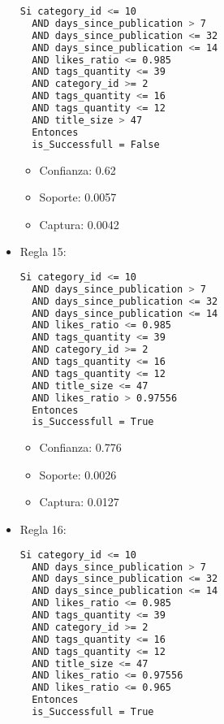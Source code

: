 \begin{itemize}
\begin{lstlisting}[language=bash, numbers=none]
  Si category_id <= 10
  AND days_since_publication > 7
  AND days_since_publication <= 32
  AND days_since_publication <= 14
  AND likes_ratio <= 0.985
  AND tags_quantity <= 39
  AND category_id >= 2
  AND tags_quantity <= 16
  AND tags_quantity <= 12
  AND title_size > 47
  Entonces
  is_Successfull = False
\end{lstlisting}

    \begin{itemize}
      \item Confianza: 0.62
      \item Soporte: 0.0057
      \item Captura: 0.0042
    \end{itemize}

  \item Regla 15:

\begin{lstlisting}[language=bash, numbers=none]
  Si category_id <= 10
  AND days_since_publication > 7
  AND days_since_publication <= 32
  AND days_since_publication <= 14
  AND likes_ratio <= 0.985
  AND tags_quantity <= 39
  AND category_id >= 2
  AND tags_quantity <= 16
  AND tags_quantity <= 12
  AND title_size <= 47
  AND likes_ratio > 0.97556
  Entonces
  is_Successfull = True
\end{lstlisting}

    \begin{itemize}
      \item Confianza: 0.776
      \item Soporte: 0.0026
      \item Captura: 0.0127
    \end{itemize}

  \item Regla 16:

\begin{lstlisting}[language=bash, numbers=none]
  Si category_id <= 10
  AND days_since_publication > 7
  AND days_since_publication <= 32
  AND days_since_publication <= 14
  AND likes_ratio <= 0.985
  AND tags_quantity <= 39
  AND category_id >= 2
  AND tags_quantity <= 16
  AND tags_quantity <= 12
  AND title_size <= 47
  AND likes_ratio <= 0.97556
  AND likes_ratio <= 0.965
  Entonces
  is_Successfull = True
\end{lstlisting}


\end{itemize}
